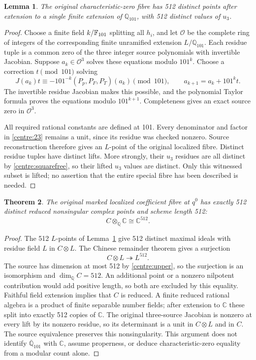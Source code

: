 \documentclass[11pt,a4paper]{article}
\newtheorem{theorem}{Theorem}[section]
\newtheorem{lemma}[theorem]{Lemma}\newtheorem{proposition}[theorem]{Proposition}
\theoremstyle{remark}\newtheorem{remark}[theorem]{Remark}
\begin{document}
\begin{lemma}\label{centre:hensel}
The original characteristic-zero fibre has 512 distinct points after
extension to a single finite extension of $\mathbb Q_{101}$, with 512
distinct values of $u_3$.
\end{lemma}
\begin{proof}
Choose a finite field $k/\mathbb F_{101}$ splitting all $h_i$, and let
$\mathcal O$ be the complete ring of integers of the corresponding
finite unramified extension $L/\mathbb Q_{101}$. Each residue tuple is
a common zero of the three integer source polynomials with invertible
Jacobian. Suppose $a_k\in\mathcal O^3$ solves these equations modulo
$101^k$. Choose a correction $t\pmod {101}$ solving
\[
 J(a_k)t\equiv-101^{-k}(P_p,P_F,P_T)(a_k)\pmod {101},
 \qquad a_{k+1}=a_k+101^kt.
\]
The invertible residue Jacobian makes this possible, and the polynomial
Taylor formula proves the equations modulo $101^{k+1}$. Completeness
gives an exact source zero in $\mathcal O^3$.

All required rational constants are defined at 101. Every denominator
and factor in \eqref{centre:23} remains a unit, since its residue was
checked nonzero. Source reconstruction therefore gives an $L$-point of
the original localized fibre. Distinct residue tuples have distinct
lifts. More strongly, their $u_3$ residues are all distinct by
\eqref{centre:squarefree}, so their lifted $u_3$ values are distinct.
Only this witnessed subset is lifted; no assertion that the entire
special fibre has been described is needed.
\end{proof}

\begin{theorem}\label{centre:complex}
The original marked localized coefficient fibre at $q^0$ has exactly
512 distinct reduced nonsingular complex points and scheme length 512:
\[
 C\otimes_{\mathbb Q}\mathbb C\cong\mathbb C^{512}.
\]
\end{theorem}
\begin{proof}
The 512 $L$-points of Lemma~\ref{centre:hensel} give 512 distinct
maximal ideals with residue field $L$ in $C\otimes L$. The Chinese
remainder theorem gives a surjection
\[
 C\otimes L\twoheadrightarrow L^{512}.
\]
The source has dimension at most 512 by \eqref{centre:upper}, so the
surjection is an isomorphism and $\dim_{\mathbb Q}C=512$.
An additional point or a nonzero nilpotent contribution would add positive
length, so both are excluded by this equality. Faithful
field extension implies that $C$ is reduced. A finite reduced rational
algebra is a product of finite separable number fields; after extension
to $\mathbb C$ these split into exactly 512 copies of $\mathbb C$.
The original three-source Jacobian is nonzero at every lift by its
nonzero residue, so its determinant is a unit in $C\otimes L$ and
in $C$. The source equivalence preserves this nonsingularity.
This argument does not identify $\overline{\mathbb Q}_{101}$ with
$\mathbb C$, assume properness, or deduce characteristic-zero equality
from a modular count alone.
\end{proof}
\end{document}
